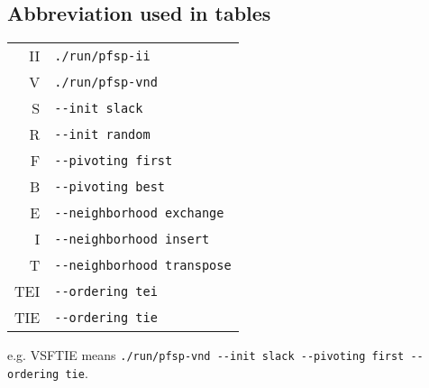 \subsection{Abbreviation used in tables}

\begin{tabular}{rl}
II & \verb!./run/pfsp-ii!\\
V  & \verb!./run/pfsp-vnd!\\
S  & \verb!--init slack!\\
R  & \verb!--init random!\\
F  & \verb!--pivoting first!\\
B  & \verb!--pivoting best!\\
E  & \verb!--neighborhood exchange!\\
I  & \verb!--neighborhood insert!\\
T  & \verb!--neighborhood transpose!\\
TEI  & \verb!--ordering tei!\\
TIE  & \verb!--ordering tie!\\
\end{tabular}

e.g. VSFTIE means \verb!./run/pfsp-vnd --init slack --pivoting first --ordering tie!.